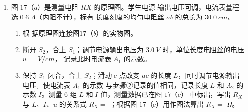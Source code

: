 \begin{enumerate}
\item 
{}
图 $ 17 $（$ a $）是测量电阻 $ RX $ 的原理图。学生电源
输出电压可调，电流表量程选 $ 0.6 \ A $（内阻不计），标有
长度刻度的均匀电阻丝 $ ab $ 的总长为 $ 30.0 \ cm $。
\begin{figure}[h!]
\centering
\begin{subfigure}{0.4\linewidth}
\centering
 
\caption{}\label{}
\end{subfigure}
\begin{subfigure}{0.4\linewidth}
\centering
 
\caption{}\label{}
\end{subfigure}
\begin{subfigure}{0.4\linewidth}
\centering
 
\caption{}\label{}
\end{subfigure}
\end{figure}

\begin{enumerate}
\item
根
据原理图连接图$ 17 $（$ b $）的实物图。


\item 
断开 $ S_{2} $，合上 $ S_{1} $；调节电源输出电压为 $ 3.0 \ V $ 时，单位长度电阻丝的电压 $ u= $
\underlinegap 
$ V/cm $，
记录此时电流表 $ A_{1} $ 的示数。


\item 
保持 $ S_{1} $ 闭合，合上 $ S_{2} $；滑动 $ c $ 点改变 $ ac $ 的长度 $ L $，同时调节电源输出电压，使电流表 $ A_{1} $ 的示数
与步骤②记录的值相同，记录长度 $ L $ 和 $ A_{2} $ 的示数 $ I $。测量 $ 6 $ 组 $ L $ 和 $ I $ 值，测量数据已在图 $ 17 $（$ c $）
中标出，写出 $ R_X $ 与 $ L $、$ I $、$ u $ 的关系式 $ R_X= $
\underlinegap 
；根据图 $ 17 $（$ c $）用作图法算出
$ R_X= $ \underlinegap 
$ \Omega $。

\end{enumerate}





\end{enumerate}
